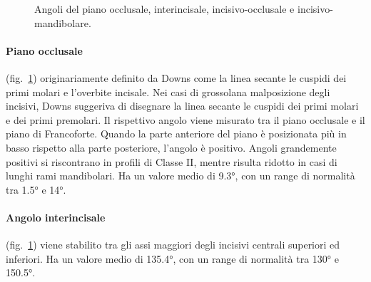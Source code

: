 \begin{figure}[!ht]
 \centering
 \caption{Angoli del piano occlusale, interincisale, incisivo-occlusale e incisivo-mandibolare.}
 \label{fig:downs_angoli_incisali_occlusale}
\end{figure}

\paragraph{Piano occlusale} (fig.~\ref{fig:downs_angoli_incisali_occlusale}) originariamente definito da Downs come la linea secante le cuspidi dei primi molari e l'overbite incisale. Nei casi di grossolana malposizione degli incisivi, Downs suggeriva di disegnare la linea secante le cuspidi dei primi molari e dei primi premolari. Il rispettivo angolo viene misurato tra il piano occlusale e il piano di Francoforte. Quando la parte anteriore del piano è posizionata più in basso rispetto alla parte posteriore, l'angolo è positivo. Angoli grandemente positivi si riscontrano in profili di Classe II, mentre risulta ridotto in casi di lunghi rami mandibolari. Ha un valore medio di 9.3°, con un range di normalità tra 1.5° e 14°.

\paragraph{Angolo interincisale} (fig.~\ref{fig:downs_angoli_incisali_occlusale}) viene stabilito tra gli assi maggiori degli incisivi centrali superiori ed inferiori. Ha un valore medio di 135.4°, con un range di normalità tra 130° e 150.5°.

